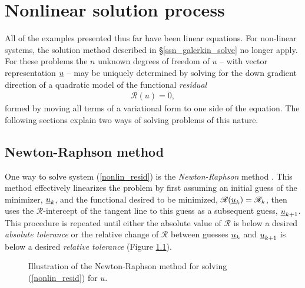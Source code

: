 
\chapter{Nonlinear solution process} \label{ssn_nonlinear_solution_process}

All of the examples presented thus far have been linear equations.  For non-linear systems, the solution method described in \S \ref{ssn_galerkin_solve} no longer apply.  For these problems the $n$ unknown degrees of freedom of $u$ -- with vector representation $\underline{u}$ --  may be uniquely determined by solving for the down gradient direction of a quadratic model of the functional  \emph{residual}
\begin{align}
  \label{nonlin_resid}
  \mathscr{R}(u) = 0,
\end{align}
formed by moving all terms of a variational form to one side of the equation.  The following sections explain two ways of solving problems of this nature.


\section{Newton-Raphson method} \label{ssn_newton_raphson}

One way to solve system (\ref{nonlin_resid}) is the  \emph{Newton-Raphson} method \citep{nocedal_2000}.  This method effectively linearizes the problem by first assuming an initial guess of the minimizer, $\underline{u}_k$, and the functional desired to be minimized, $\mathscr{R}(\underline{u}_k) = \mathscr{R}_k$, then uses the $\mathscr{R}$-intercept of the tangent line to this guess as a subsequent guess, $\underline{u}_{k+1}$.  This procedure is repeated until either the absolute value of $\mathscr{R}$ is below a desired \emph{absolute tolerance} or the relative change of $\mathscr{R}$ between guesses $\underline{u}_k$ and $\underline{u}_{k+1}$ is below a desired \emph{relative tolerance} (Figure \ref{nr_image}).

\begin{figure}
  \centering
    \def\svgwidth{\linewidth}
    
  \caption[Newton-Raphson diagram]{Illustration of the Newton-Raphson method for solving (\ref{nonlin_resid}) for $u$.}
  \label{nr_image}
\end{figure}


